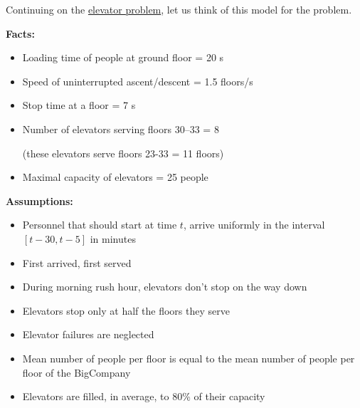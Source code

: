 
\question

Continuing on the \hyperref[elevator-model]{elevator problem}, let us think of this model for the problem.

\textbf{Facts:}
\begin{itemize}
	\item Loading time of people at ground floor = 20 s
	\item Speed of uninterrupted ascent/descent = 1.5 floors/s
	\item Stop time at a floor = 7 s
	\item Number of elevators serving floors 30--33 = 8

	(these elevators serve floors 23-33 = 11 floors)
	
	\item Maximal capacity of elevators = 25 people
\end{itemize}


\textbf{Assumptions:}
\begin{itemize}
	\item Personnel that should start at time $t$, arrive uniformly in the interval $[t-30, t-5]$ in minutes
	\item First arrived, first served
	\item During morning rush hour, elevators don't stop on the way down
	\item Elevators stop only at half the floors they serve
	\item Elevator failures are neglected
	\item Mean number of people per floor is equal to the mean number of people per floor of the BigCompany
	\item Elevators are filled, in average, to 80\% of their capacity
\end{itemize}


